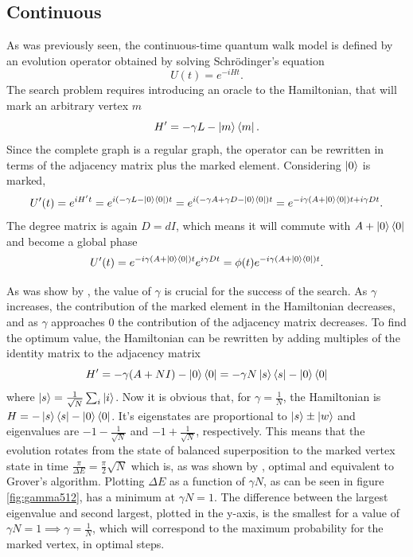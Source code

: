 \documentclass[../../dissertation.tex]{subfiles}
\begin{document}
\subsection{Continuous}
As was previously seen, the continuous-time quantum walk model is defined by an evolution operator obtained by solving Schrödinger's equation
\begin{equation}
	U(t) = e^{-iHt}.
\end{equation}
The search problem requires introducing an oracle to the Hamiltonian, that will mark an arbitrary vertex $m$ %
\begin{equation}
	H' = -\gamma L - \ket{m}\bra{m}.
\end{equation}
Since the complete graph is a regular graph, the operator can be rewritten in terms of the adjacency matrix plus the marked element. Considering $\ket{0}$ is marked,
\begin{equation}
	U'(t) = e^{iH't} = e^{i(-\gamma L - \ket{0}\bra{0})t} = e^{i(-\gamma A + \gamma D - \ket{0}\bra{0})t} = e^{-i\gamma(A+\ket{0}\bra{0})t + i\gamma D t}.
\end{equation}
The degree matrix is again $D=dI$, which means it will commute with $A+\ket{0}\bra{0}$ and become a global phase
\begin{equation}
	U'(t) = e^{-i\gamma(A+\ket{0}\bra{0})t}e^{i\gamma D t} = \phi(t)e^{-i\gamma(A+\ket{0}\bra{0})t}.
\end{equation}\par
As was show by \cite{zalka1999}, the value of $\gamma$ is crucial for the success of the search. As $\gamma$ increases, the contribution of the marked element in the Hamiltonian decreases, and as $\gamma$ approaches $0$ the contribution of the adjacency matrix decreases. To find the optimum value, the Hamiltonian can be rewritten by adding multiples of the identity matrix to the adjacency matrix 
\begin{equation}
	H' = -\gamma(A+NI) - \ket{0}\bra{0} = -\gamma N\ket{s}\bra{s} - \ket{0}\bra{0}
\end{equation}
where $\ket{s} = \frac{1}{\sqrt{N}}\sum_i \ket{i}$. Now it is obvious that, for $\gamma = \frac{1}{N}$, the Hamiltonian is $H = -\ket{s}\bra{s} - \ket{0}\bra{0}$. It's eigenstates are proportional to $\ket{s}\pm\ket{w}$ and eigenvalues are $-1 - \frac{1}{\sqrt{N}}$ and $-1 + \frac{1}{\sqrt{N}}$, respectively. This means that the evolution rotates from the state of balanced superposition to the marked vertex state in time $\frac{\pi}{\Delta E} = \frac{\pi}{2}\sqrt{N}$ which is, as was shown by \cite{zalka1999}, optimal and equivalent to Grover's algorithm. Plotting $\Delta E$ as a function of $\gamma N$, as can be seen in figure \ref{fig:gamma512}, has a minimum at $\gamma N =1$. The difference between the largest eigenvalue and second largest, plotted in the y-axis, is the smallest for a value of $\gamma N = 1 \implies \gamma =\frac{1}{N}$, which will correspond to the maximum probability for the marked vertex, in optimal steps.
\end{document}
